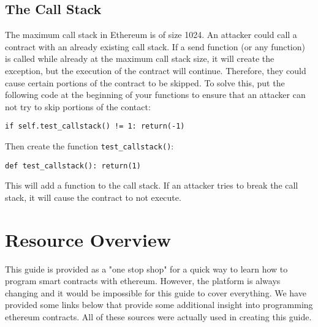 \documentclass[12pt]{article}
\begin{document}
\subsection{The Call Stack}

The maximum call stack in Ethereum is of size 1024. An attacker could call a contract with an already existing call stack. If a send function (or any function) is called while already at the maximum call stack size, it will create the exception, but the execution of the contract will continue. Therefore, they could cause certain portions of the contract to be skipped. To solve this, put the following code at the beginning of your functions to ensure that an attacker can not try to skip portions of the contact:

\begin{verbatim}
if self.test_callstack() != 1: return(-1)
\end{verbatim} 

Then create the function \texttt{test\_callstack()}:

\begin{verbatim}
def test_callstack(): return(1)
\end{verbatim}

This will add a function to the call stack. If an attacker tries to break the call stack, it will cause the contract to not execute.




\section{Resource Overview}

This guide is provided as a "one stop shop" for a quick way to learn how to program smart contracts with ethereum. However, the platform is always changing and it would be impossible for this guide to cover everything. We have provided some links below that provide some additional insight into programming ethereum contracts. All of these sources were actually used in creating this guide. 
\end{document}
